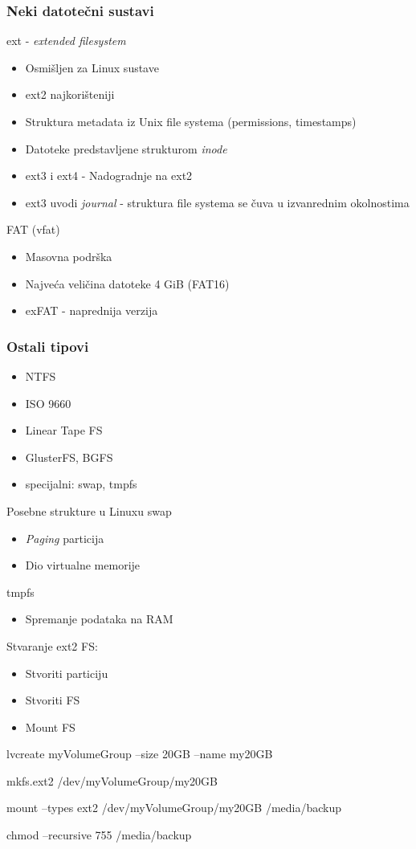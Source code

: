 \documentclass[t]{beamer}
\begin{document}
\begin{frame}
	\frametitle{Neki datotečni sustavi}
	ext - \emph{extended filesystem}
	\begin{itemize}
		\item Osmišljen za Linux sustave
		\item ext2 najkorišteniji
		\item Struktura metadata iz Unix file systema (permissions, timestamps)
		\item Datoteke predstavljene strukturom \emph{inode}
		\item ext3 i ext4 - Nadogradnje na ext2
		\item ext3 uvodi \emph{journal} - struktura file systema se čuva u izvanrednim okolnostima
	\end{itemize}
	FAT (vfat)\
	\begin{itemize}
		\item Masovna podrška
		\item Najveća veličina datoteke 4 GiB (FAT16)
		\item exFAT - naprednija verzija
	\end{itemize}
\end{frame}

\begin{frame}
	\frametitle{Ostali tipovi}
    \begin{itemize}
        \item NTFS
        \item ISO 9660
        \item Linear Tape FS
        \item GlusterFS, BGFS
        \item specijalni: swap, tmpfs
    \end{itemize}

    Posebne strukture u Linuxu
	swap
	\begin{itemize}
		\item \emph{Paging} particija
		\item Dio virtualne memorije
	\end{itemize}
	tmpfs
	\begin{itemize}
		\item Spremanje podataka na RAM
	\end{itemize}
\end{frame}

\begin{frame}
    Stvaranje ext2 FS:
    \begin{itemize}
        \item Stvoriti particiju
        \item Stvoriti FS
        \item Mount FS
    \end{itemize}

    lvcreate myVolumeGroup --size 20GB  --name my20GB

    mkfs.ext2 /dev/myVolumeGroup/my20GB
  
    mount --types ext2 /dev/myVolumeGroup/my20GB /media/backup

    chmod --recursive 755 /media/backup
    
\end{frame}
\end{document}
